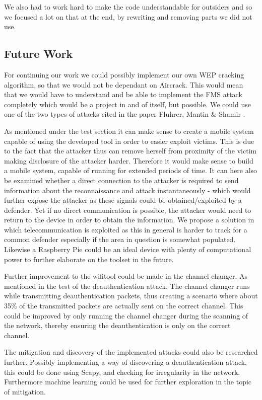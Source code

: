 We also had to work hard to make the code understandable for outsiders and so we focused a lot on that at the end, by rewriting and removing parts we did not use. 


\subsection{Future Work}
For continuing our work we could possibly implement our own WEP cracking algorithm, so that we would not be dependant on Aircrack. This would mean that we would have to understand and be able to implement the FMS attack completely which would be a project in and of itself, but possible. We could use one of the two types of attacks cited in the paper Fluhrer, Mantin \& Shamir \cite{Weakness}.

As mentioned under the test section it can make sense to create a mobile system capable of using the developed tool in order to easier exploit victims. This is due to the fact that the attacker thus can remove herself from proximity of the victim making disclosure of the attacker harder. Therefore it would make sense to build a mobile system, capable of running for extended periods of time. It can here also be examined whether a direct connection to the attacker is required to send information about the reconnaissance and attack instantaneously - which would further expose the attacker as these signals could be obtained/exploited by a defender. Yet if no direct communication is possible, the attacker would need to return to the device in order to obtain the information. We propose a solution in which telecommunication is exploited as this in general is harder to track for a common defender especially if the area in question is somewhat populated. Likewise a Raspberry Pie could be an ideal device with plenty of computational power to further elaborate on the toolset in the future.

Further improvement to the wifitool could be made in the channel changer. As mentioned in the test of the deauthentication attack. The channel changer runs while transmitting deauthentication packets, thus creating a scenario where about 35\% of the transmitted packets are actually sent on the correct channel. This could be improved by only running the channel changer during the scanning of the network, thereby ensuring the deauthentication is only on the correct channel. 

The mitigation and discovery of the implemented attacks could also be researched further. Possibly implementing a way of discovering a deauthentication attack, this could be done using Scapy, and checking for irregularity in the network. Furthermore machine learning could be used for further exploration in the topic of mitigation. 


